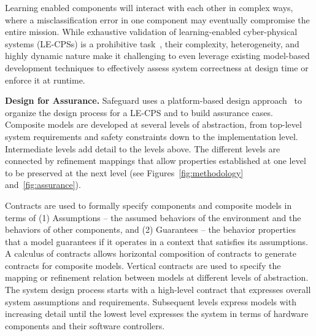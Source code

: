 \documentclass[12pt]{dod-blank}
\begin{document}
Learning enabled components will interact with each other in complex ways, where a misclassification error in one component may eventually compromise the entire mission.   
While exhaustive validation of learning-enabled cyber-physical systems (LE-CPSs) is a prohibitive task~\cite{Kalra16},
their complexity, heterogeneity, and highly dynamic nature
make it challenging to even leverage existing model-based development techniques to effectively assess system correctness 
at design time or enforce it at runtime.

\textbf{Design for Assurance.} Safeguard uses a platform-based design approach~\cite{Nuzzo15b} to organize the design process for a LE-CPS and to build assurance cases. Composite models are developed at several levels of abstraction,
from top-level system requirements and safety constraints down to the
implementation level.  Intermediate levels add detail to the levels
above.  The different levels are connected by refinement mappings that
allow properties established at one level to be preserved at the next
level (see Figures~\ref{fig:methodology} and~\ref{fig:assurance}).

Contracts are used to formally specify components and composite models
in terms of (1) Assumptions -- the assumed behaviors of the
environment and the behaviors of other components, and (2) Guarantees
-- the behavior properties that a model guarantees if it operates in a
context that satisfies its assumptions.  A calculus of contracts
allows horizontal composition of contracts to generate contracts for
composite models.  Vertical contracts are used to specify the mapping
or refinement relation between models at different levels of
abstraction.  The system design process starts with a high-level
contract that expresses overall system assumptions and requirements.
Subsequent levels express models with increasing detail until the
lowest level expresses the system in terms of hardware components and
their software controllers.
\end{document}
